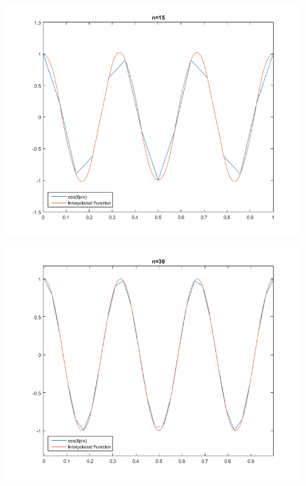 \documentclass[11pt,a4paper]{article}
\begin{document}
\begin{itemize}
\begin{enumerate} [label={\alph*)}]
\begin{center}
					\end{center}
					\begin{center}
						\includegraphics[width=1\linewidth]{ch5q33_15}
					\end{center}
					\begin{center}
						\includegraphics[width=1\linewidth]{ch5q33_30}
					\end{center}
				\end{enumerate}
		\end{itemize}
\end{document}

